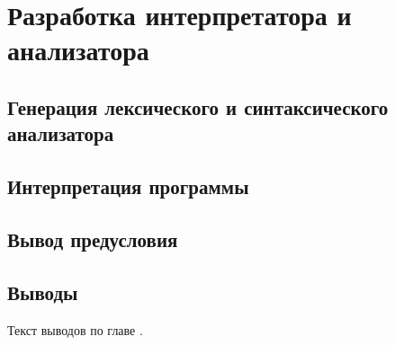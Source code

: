 \chapter{Разработка интерпретатора и анализатора} \label{ch3}

\section{Генерация лексического и синтаксического анализатора}
\section{Интерпретация программы}
\section{Вывод предусловия}

\section{Выводы} \label{ch3:conclusion}
Текст выводов по главе \thechapter.